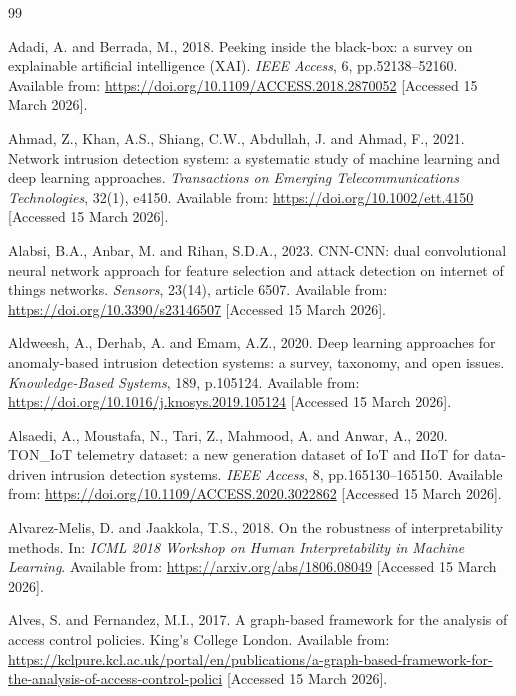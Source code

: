 \documentclass[12pt,a4paper]{report}
\begin{document}

\begin{thebibliography}{99}

Adadi, A. and Berrada, M., 2018. Peeking inside the black-box: a survey on explainable artificial intelligence (XAI). \textit{IEEE Access}, 6, pp.52138--52160. Available from: \url{https://doi.org/10.1109/ACCESS.2018.2870052} [Accessed 15 March 2026].

Ahmad, Z., Khan, A.S., Shiang, C.W., Abdullah, J. and Ahmad, F., 2021. Network intrusion detection system: a systematic study of machine learning and deep learning approaches. \textit{Transactions on Emerging Telecommunications Technologies}, 32(1), e4150. Available from: \url{https://doi.org/10.1002/ett.4150} [Accessed 15 March 2026].

Alabsi, B.A., Anbar, M. and Rihan, S.D.A., 2023. CNN-CNN: dual convolutional neural network approach for feature selection and attack detection on internet of things networks. \textit{Sensors}, 23(14), article 6507. Available from: \url{https://doi.org/10.3390/s23146507} [Accessed 15 March 2026].

Aldweesh, A., Derhab, A. and Emam, A.Z., 2020. Deep learning approaches for anomaly-based intrusion detection systems: a survey, taxonomy, and open issues. \textit{Knowledge-Based Systems}, 189, p.105124. Available from: \url{https://doi.org/10.1016/j.knosys.2019.105124} [Accessed 15 March 2026].

Alsaedi, A., Moustafa, N., Tari, Z., Mahmood, A. and Anwar, A., 2020. TON\_IoT telemetry dataset: a new generation dataset of IoT and IIoT for data-driven intrusion detection systems. \textit{IEEE Access}, 8, pp.165130--165150. Available from: \url{https://doi.org/10.1109/ACCESS.2020.3022862} [Accessed 15 March 2026].

Alvarez-Melis, D. and Jaakkola, T.S., 2018. On the robustness of interpretability methods. In: \textit{ICML 2018 Workshop on Human Interpretability in Machine Learning}. Available from: \url{https://arxiv.org/abs/1806.08049} [Accessed 15 March 2026].

Alves, S. and Fernandez, M.I., 2017. A graph-based framework for the analysis of access control policies. King's College London. Available from: \url{https://kclpure.kcl.ac.uk/portal/en/publications/a-graph-based-framework-for-the-analysis-of-access-control-polici} [Accessed 15 March 2026].


\end{thebibliography}
\end{document}
